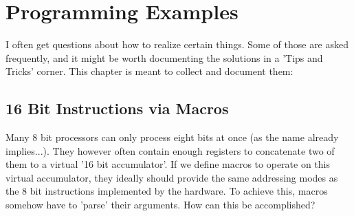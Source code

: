 \documentclass[12pt,twoside]{report}
\begin{document}

\cleardoublepage
\chapter{Programming Examples}

I often get questions about how to realize certain things. Some of those are
asked frequently, and it might be worth documenting the solutions in a 'Tips
and Tricks' corner.  This chapter is meant to collect and document them:

\section{16 Bit Instructions via Macros}

Many 8 bit processors can only process eight bits at once (as the name already
implies...).  They however often contain enough registers to concatenate
two of them to a virtual '16 bit accumulator'.  If we define macros to operate
on this virtual accumulator, they ideally should provide the same addressing
modes as the 8 bit instructions implemented by the hardware.  To achieve this,
macros somehow have to 'parse' their arguments.  How can this be accomplished?
\end{document}
